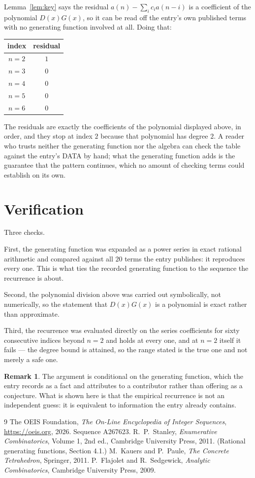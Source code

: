 \documentclass[11pt,a4paper]{article}
\theoremstyle{plain}
\theoremstyle{definition}
\newtheorem{remark}[theorem]{Remark}
\begin{document}
Lemma~\ref{lem:key} says the residual $a(n)-\sum_ic_ia(n-i)$ is a coefficient of the
polynomial $D(x)G(x)$, so it can be read off the entry's own published terms with no
generating function involved at all. Doing that:
\begin{center}
\begin{tabular}{cc}
index & residual \\ \hline
$n=2$ & $1$ \\
$n=3$ & $0$ \\
$n=4$ & $0$ \\
$n=5$ & $0$ \\
$n=6$ & $0$
\end{tabular}
\end{center}
The residuals are exactly the coefficients of the polynomial displayed above, in order, and
they stop at index $2$ because that polynomial has degree $2$. A reader who trusts
neither the generating function nor the algebra can check the table against the entry's DATA
by hand; what the generating function adds is the guarantee that the pattern continues, which
no amount of checking terms could establish on its own.

\section{Verification}

Three checks.

First, the generating function was expanded as a power series in exact rational arithmetic and
compared against all $20$ terms the entry publishes: it reproduces every one. This is
what ties the recorded generating function to the sequence the recurrence is about.

Second, the polynomial division above was carried out symbolically, not numerically, so the
statement that $D(x)G(x)$ is a polynomial is exact rather than approximate.

Third, the recurrence was evaluated directly on the series coefficients for sixty consecutive
indices beyond $n=2$ and holds at every one, and at $n=2$ itself it fails --- the
degree bound is attained, so the range stated is the true one and not merely a safe one.

\begin{remark}
The argument is conditional on the generating function, which the entry records as a fact and
attributes to a contributor rather than offering as a conjecture. What is shown here is that
the empirical recurrence is not an independent guess: it is equivalent to information the
entry already contains.
\end{remark}

\begin{thebibliography}{9}
 The OEIS Foundation, \emph{The On-Line Encyclopedia of Integer
Sequences}, \url{https://oeis.org}, 2026. Sequence A267623.
 R.~P.~Stanley, \emph{Enumerative Combinatorics}, Volume 1, 2nd ed.,
Cambridge University Press, 2011. (Rational generating functions, Section 4.1.)
 M.~Kauers and P.~Paule, \emph{The Concrete Tetrahedron}, Springer, 2011.
 P.~Flajolet and R.~Sedgewick, \emph{Analytic Combinatorics}, Cambridge
University Press, 2009.
\end{thebibliography}
\end{document}
